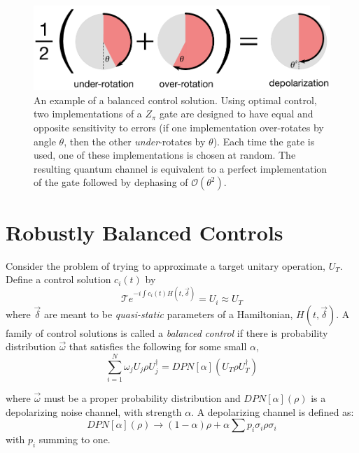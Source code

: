\documentclass[aps,nofootinbib,pra,notitlepage,twocolumn]{revtex4-1}
\newcommand{\order}[1]{\mathcal{O}\left( #1 \right)}
\begin{document}
\begin{figure}
  \centering
  \includegraphics[width=\columnwidth]{simple_example.pdf}
  \caption{An example of a balanced control solution. Using optimal control, two implementations of a $Z_\pi$ gate are designed to have equal and opposite sensitivity to errors (if one implementation over-rotates by angle $\theta$, then the other \emph{under}-rotates by $\theta$). Each time the gate is used, one of these implementations is chosen at random. The resulting quantum channel is equivalent to a perfect implementation of the gate followed by dephasing of $\order{\theta^2}$.}
  \label{fig:simple_example}
\end{figure}

\section{Robustly Balanced Controls}
 Consider the problem of trying to approximate a target unitary operation, $U_T$. Define a control solution $c_i(t)$ by  \begin{equation} 
\mathcal{T}e^{-i\int c_i(t)H(t, \vec{\delta})} = U_i \approx U_T
 \end{equation}
 where $\vec{\delta}$ are meant to be \textit{quasi-static}\cite{Ball2016} parameters of a Hamiltonian, $H(t, \vec{\delta})$. A family of control solutions is called a \emph{balanced control} if there is probability distribution $\vec{\omega}$ that satisfies the following for some small $\alpha$,
\begin{equation}\label{eq:1}
  \sum_{i=1}^N \omega_j U_j \rho U_j^\dagger = DPN[\alpha]\left(U_T \rho U_T^\dagger \right)
\end{equation}

where $\vec{\omega}$ must be a proper probability distribution and $DPN[\alpha](\rho)$ is a depolarizing noise channel, with strength $\alpha$. A depolarizing channel is defined as:
\begin{equation}\label{eq:2}
  DPN[\alpha](\rho) \rightarrow (1-\alpha)\rho + \alpha\sum p_i \sigma_i\rho\sigma_i
\end{equation}
with $p_i$ summing to one. 
\end{document}

